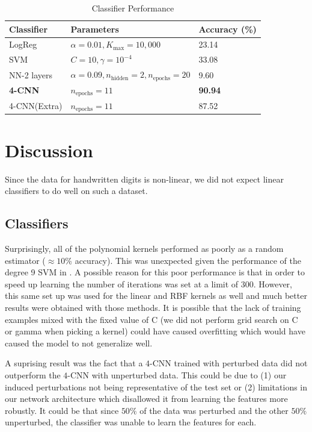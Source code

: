 \documentclass[conference]{IEEEtran}
\begin{document}
\begin{table}[]
\centering
\caption{Classifier Performance}
\label{clfs}
\begin{tabular}{lll}
\hline
\multicolumn{1}{|l|}{\textbf{Classifier}} & \multicolumn{1}{l|}{\textbf{Parameters}} & \multicolumn{1}{l|}{\textbf{Accuracy (\%)}} \\ \hline
LogReg                                    &       $\alpha=0.01, K_{\max}=10,000$    & 23.14              \\
SVM                                       &       $C=10,\gamma=10^{-4}$        & 33.08                        \\
NN-2 layers          &       $\alpha=0.09,n_{\text{hidden}}=2,n_{\text{epochs}}=20$      &   9.60               \\
\textbf{4-CNN}                            & \textbf{$n_{\text{epochs}}=11$}   & \textbf{90.94}           \\
4-CNN(Extra)                              &             $n_{\text{epochs}}=11$        & 87.52                                      
\end{tabular}
\end{table}

\section{Discussion}

Since the data for handwritten digits is non-linear, we did not expect linear classifiers to do well on such a dataset. 

\subsection{Classifiers}

Surprisingly, all of the polynomial kernels performed as poorly as a random estimator ($\approx 10$\% accuracy). This was unexpected given the performance of the degree 9 SVM in \cite{LeCunn98}. A possible reason for this poor performance is that in order to speed up learning the number of iterations was set at a limit of 300. However, this same set up was used for the linear and RBF kernels as well and much better results were obtained with those methods. It is possible that the lack of training examples mixed with the fixed value of C (we did not perform grid search on C or gamma when picking a kernel) could have caused overfitting which would have caused the model to not generalize well.

A suprising result was the fact that a $4$-CNN trained with perturbed data did not outperform the $4$-CNN with unperturbed data. This could be due to (1) our induced perturbations not being representative of the test set or (2) limitations in our network architecture which disallowed it from learning the features more robustly. It could be that since $50\%$ of the data was perturbed and the other $50\%$ unperturbed, the classifier was unable to learn the features for each.
\end{document}
